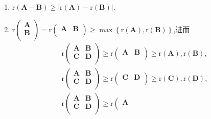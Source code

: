 \documentclass[../../main.tex]{subfiles}
\begin{document}
\begin{proposition}[矩阵秩的基本公式]
\begin{enumerate}[(1)]
\item \label{矩阵秩的基本公式6}\(\mathrm{r}(\boldsymbol{A}-\boldsymbol{B})\geqslant |\mathrm{r}(\boldsymbol{A})-\mathrm{r}(\boldsymbol{B})|\).

\item \label{矩阵秩的基本公式7} $\mathrm{r}\left( \begin{array}{c}
\boldsymbol{A}\\
\boldsymbol{B}\\
\end{array} \right) =\mathrm{r}\left( \begin{matrix}
\boldsymbol{A}&		\boldsymbol{B}\\
\end{matrix} \right) \geqslant \max \left\{ \mathrm{r}\left( \boldsymbol{A} \right) ,\mathrm{r}\left( \boldsymbol{B} \right) \right\}$,进而
\begin{gather*}
\mathrm{r}\left( \begin{matrix}
\boldsymbol{A}&		\boldsymbol{B}\\
\boldsymbol{C}&		\boldsymbol{D}\\
\end{matrix} \right) \geqslant \mathrm{r}\left( \begin{matrix}
\boldsymbol{A}&		\boldsymbol{B}\\
\end{matrix} \right) \geqslant \mathrm{r}\left( \boldsymbol{A} \right) ,\mathrm{r}\left( \boldsymbol{B} \right) ,
\\
\mathrm{r}\left( \begin{matrix}
\boldsymbol{A}&		\boldsymbol{B}\\
\boldsymbol{C}&		\boldsymbol{D}\\
\end{matrix} \right) \geqslant \mathrm{r}\left( \begin{matrix}
\boldsymbol{C}&		\boldsymbol{D}\\
\end{matrix} \right) \geqslant \mathrm{r}\left( \boldsymbol{C} \right) ,\mathrm{r}\left( \boldsymbol{D} \right) ,
\\
\mathrm{r}\left( \begin{matrix}
\boldsymbol{A}&		\boldsymbol{B}\\
\boldsymbol{C}&		\boldsymbol{D}\\
\end{matrix} \right) \geqslant \mathrm{r}\left( \begin{array}{c}
\boldsymbol{A}\\

\end{array}
\end{gather*}
\end{enumerate}
\end{proposition}
\end{document}
